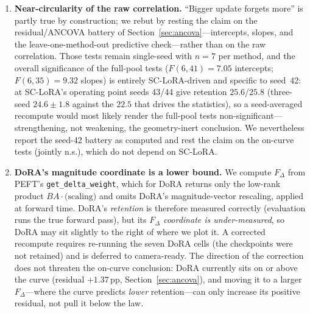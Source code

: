 \documentclass[11pt]{article}
\newcommand{\dw}{F_{\Delta}}
\begin{document}
\begin{enumerate}
        Section~\ref{sec:law}). What remains uncalibrated is \emph{Qwen}: no
        Qwen2.5-7B no-fine-tuning ceiling has been measured, and the reading of
        Qwen's steeper slope ($-32$ vs $-14.8$\,pp/decade) as a scale
        difference leans on it.
  \item \textbf{Near-circularity of the raw correlation.} ``Bigger update forgets
        more'' is partly true by construction; we rebut by resting the claim on the
        residual/ANCOVA battery of Section~\ref{sec:ancova}---intercepts, slopes,
        and the leave-one-method-out predictive check---rather than on the raw
        correlation. Those tests remain single-seed with $n\!=\!7$ per method, and
        the overall significance of the full-pool tests ($F(6,41)\!=\!7.05$
        intercepts; $F(6,35)\!=\!9.32$ slopes) is entirely SC-LoRA-driven and
        specific to seed~42: at SC-LoRA's operating point seeds 43/44 give
        retention $25.6$/$25.8$ (three-seed $24.6\!\pm\!1.8$ against the $22.5$
        that drives the statistics), so a seed-averaged recompute would most
        likely render the full-pool tests non-significant---strengthening, not
        weakening, the geometry-inert conclusion. We nevertheless report the
        seed-42 battery as computed and rest the claim on the on-curve tests
        (jointly n.s.), which do not depend on SC-LoRA.
  \item \textbf{DoRA's magnitude coordinate is a lower bound.} We compute $\dw$
        from PEFT's \texttt{get\_delta\_weight}, which for DoRA returns only the
        low-rank product $B A \cdot\text{(scaling)}$ and omits DoRA's
        magnitude-vector rescaling, applied at forward time. DoRA's
        \emph{retention} is therefore measured correctly (evaluation runs the true
        forward pass), but its \emph{$\dw$ coordinate is under-measured}, so DoRA
        may sit slightly to the right of where we plot it. A corrected recompute
        requires re-running the seven DoRA cells (the checkpoints were not
        retained) and is deferred to camera-ready. The direction of the correction
        does not threaten the on-curve conclusion: DoRA currently sits on or above
        the curve (residual $+1.37$\,pp, Section~\ref{sec:ancova}), and moving it to
        a larger $\dw$---where the curve predicts \emph{lower} retention---can only
        increase its positive residual, not pull it below the law.
\end{enumerate}
\end{document}
